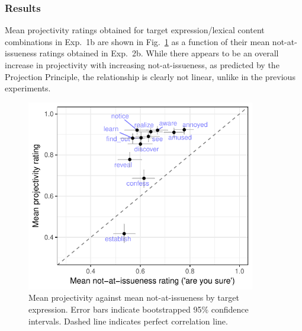 \documentclass[11pt,fleqn]{article}
\newcommand{\6}{\mbox{$[\hspace*{-.6mm}[$}}
\newcommand{\9}{\mbox{$]\hspace*{-.6mm}]$}}
\newcommand{\figref}[1]{Fig.~\ref{#1}}
\begin{document}
\subsubsection{Results}

Mean projectivity ratings obtained for target expression/lexical content combinations in Exp.~1b are shown in \figref{fig:f-proj-ai-2b} as a function of their mean not-at-issueness ratings obtained in Exp.~2b. While there appears to be an overall increase in projectivity with increasing not-at-issueness, as predicted by the Projection Principle, the relationship is clearly not linear, unlike in the previous experiments. 

\begin{figure}[!h]

\begin{center}
\includegraphics[width=10cm]{../results/exp2b/graphs/ai-proj-bytrigger-labels}
\end{center}

\caption{Mean projectivity against mean not-at-issueness by target expression. Error bars indicate bootstrapped 95\% confidence intervals. Dashed line indicates perfect correlation line.}
\label{fig:f-proj-ai-2b}
\end{figure}


%
%
%
%
%
\end{document}
